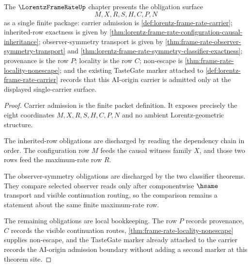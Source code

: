 \begin{theorem}
\label{thm:lorentz-frame-rate-tastegate-obligation-package}
The $\LorentzFrameRateUp$ chapter presents the obligation surface
$$
M,X,R,S,H,C,P,N
$$
as a single finite package: carrier admission is \autoref{def:lorentz-frame-rate-carrier}; inherited-row exactness is given by \autoref{thm:lorentz-frame-rate-configuration-causal-inheritance}; observer-symmetry transport is given by \autoref{thm:frame-rate-observer-symmetry-transport} and \autoref{thm:lorentz-frame-rate-symmetry-classifier-exactness}; provenance is the row $P$; locality is the row $C$; non-escape is \autoref{thm:frame-rate-locality-nonescape}; and the existing TasteGate marker attached to \autoref{def:lorentz-frame-rate-carrier} records that this AI-origin carrier is admitted only at the displayed single-carrier surface.
\end{theorem}
\begin{proof}
Carrier admission is the finite packet definition. It exposes precisely the eight coordinates $M,X,R,S,H,C,P,N$ and no ambient Lorentz-geometric structure.

The inherited-row obligations are discharged by reading the dependency chain in order. The configuration row $M$ feeds the causal witness family $X$, and those two rows feed the maximum-rate row $R$.

The observer-symmetry obligations are discharged by the two classifier theorems. They compare selected observer reads only after componentwise $\hsame$ transport and visible continuation routing, so the comparison remains a statement about the same finite maximum-rate row.

The remaining obligations are local bookkeeping. The row $P$ records provenance, $C$ records the visible continuation routes, \autoref{thm:frame-rate-locality-nonescape} supplies non-escape, and the TasteGate marker already attached to the carrier records the AI-origin admission boundary without adding a second marker at this theorem site.
\end{proof}

